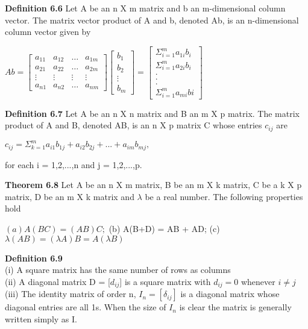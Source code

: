 \documentclass{article}
\begin{document}
\textbf {Definition 6.6} Let A be an n X m matrix and b an m-dimensional column vector. The matrix vector product of A and b, denoted Ab, is an n-dimensional column vector given by
\begin{center}
$Ab = 
\begin{bmatrix}
 a_{11} & a_{12} & \dots & a_{1m} \\
 a_{21} & a_{22} & \dots & a_{2m} \\
 \vdots & \vdots & \vdots & \vdots \\
 a_{n1} & a_{n2} & \dots & a_{nm}
\end{bmatrix}
\begin{bmatrix}
b_1 \\
b_2 \\
\vdots \\
b_m
\end{bmatrix}
=
\begin{bmatrix}
\Sigma_{i = 1}^m a_{1i} b_i \\
\Sigma_{i=1}^m a_{2i} b_i \\
				. \\
				. \\
				. \\
\Sigma_{i = 1}^{m} a_{mi} b{i}
\end{bmatrix}
$
\end{center}

\textbf{Definition 6.7} Let A be an n X n matrix and B an m X p matrix. The matrix product of A and B, denoted AB, is an n X p matrix C whose entries $c_{ij}$ are 
\begin{center}
$c_{ij} = \Sigma_{k=1}^m a_{i1} b_{1j} + a_{i2} b_{2j} + ... + a_{im} b_{mj},$
\end{center}
for each i = 1,2,...,n and j = 1,2,...,p.

\textbf{Theorem 6.8} Let A be an n X m matrix, B be an m X k matrix, C be a k X p matrix, D be an m X k matrix and $\lambda$ be a real number. The following properties hold
\begin{center}
$(a) A(BC) = (AB)C;$				(b) A(B+D) = AB + AD; 			(c) $\lambda (AB) = (\lambda A) B = A(\lambda B)$
\end{center}

\textbf {Definition 6.9} \\ (i) A square matrix has the same number of rows as columns \\
(ii) A diagonal matrix D = [$d_{ij}$] is a square matrix with $d_{ij} = 0$ whenever $i \neq j$ \\
(iii) The identity matrix of order n, $I_n = [\delta_{ij}]$ is a diagonal matrix whose diagonal entries are all 1s. When the size of $I_n$ is clear the matrix is generally written simply as I.
\end{document}
